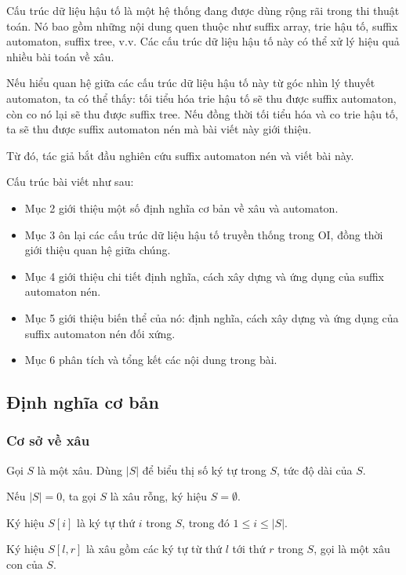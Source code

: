\documentclass[11pt]{article}
\begin{document}
Cấu trúc dữ liệu hậu tố là một hệ thống đang được dùng rộng rãi trong thi thuật
toán. Nó bao gồm những nội dung quen thuộc như suffix array, trie hậu tố,
suffix automaton, suffix tree, v.v. Các cấu trúc dữ liệu hậu tố này có thể xử
lý hiệu quả nhiều bài toán về xâu.

Nếu hiểu quan hệ giữa các cấu trúc dữ liệu hậu tố này từ góc nhìn lý thuyết
automaton, ta có thể thấy: tối tiểu hóa trie hậu tố sẽ thu được suffix
automaton, còn co nó lại sẽ thu được suffix tree. Nếu đồng thời tối tiểu hóa và
co trie hậu tố, ta sẽ thu được suffix automaton nén mà bài viết này giới thiệu.

Từ đó, tác giả bắt đầu nghiên cứu suffix automaton nén và viết bài này.

Cấu trúc bài viết như sau:

\begin{itemize}
  \item Mục 2 giới thiệu một số định nghĩa cơ bản về xâu và automaton.
  \item Mục 3 ôn lại các cấu trúc dữ liệu hậu tố truyền thống trong OI, đồng
  thời giới thiệu quan hệ giữa chúng.
  \item Mục 4 giới thiệu chi tiết định nghĩa, cách xây dựng và ứng dụng của
  suffix automaton nén.
  \item Mục 5 giới thiệu biến thể của nó: định nghĩa, cách xây dựng và ứng dụng
  của suffix automaton nén đối xứng.
  \item Mục 6 phân tích và tổng kết các nội dung trong bài.
\end{itemize}

\subsection{Định nghĩa cơ bản}

\subsubsection{Cơ sở về xâu}

Gọi \(S\) là một xâu. Dùng \(|S|\) để biểu thị số ký tự trong \(S\), tức độ dài
của \(S\).

Nếu \(|S|=0\), ta gọi \(S\) là xâu rỗng, ký hiệu \(S=\emptyset\).

Ký hiệu \(S[i]\) là ký tự thứ \(i\) trong \(S\), trong đó \(1\le i\le |S|\).

Ký hiệu \(S[l,r]\) là xâu gồm các ký tự từ thứ \(l\) tới thứ \(r\) trong \(S\),
gọi là một xâu con của \(S\).
\end{document}
